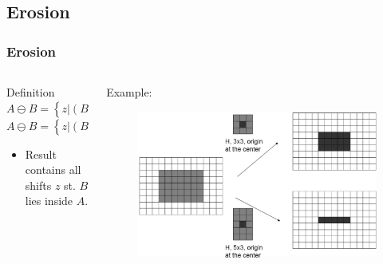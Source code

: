 %
%

\subsection{Erosion}

\begin{frame}
\frametitle{Erosion}
\begin{columns}
\begin{column}{.5\textwidth}
\begin{block}{Definition}
$A \ominus B = \left \{ z | \left ( B \right )_{z} \subseteq A \right \}$\\
$A \ominus B = \left \{ z | \left (B\right )_{z}  \cap A^{c} = \emptyset \right \}$
\end{block}
\begin{itemize}
\item Result contains all shifts $z$ st. $B$ lies inside $A$.
\end{itemize}
\end{column}
\begin{column}{.5\textwidth}
Example:
\begin{figure}[!h]
\includegraphics[width=\textwidth]{erosion-ex-1}
\end{figure}
\end{column}
\end{columns}
\end{frame}

